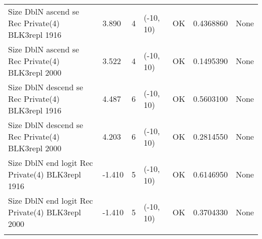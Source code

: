 \documentclass[11pt,
  english,
  letterpaper,
]{article}
\begin{document}
\begin{landscape}
\begin{longtable}[t]{>{\raggedright\arraybackslash}p{7cm}lllll>{\raggedright\arraybackslash}p{4cm}}
Size DblN ascend se Rec Private(4) BLK3repl 1916 & 3.890 & 4 & (-10, 10) & OK & 0.4368860 & None\\
Size DblN ascend se Rec Private(4) BLK3repl 2000 & 3.522 & 4 & (-10, 10) & OK & 0.1495390 & None\\
Size DblN descend se Rec Private(4) BLK3repl 1916 & 4.487 & 6 & (-10, 10) & OK & 0.5603100 & None\\
Size DblN descend se Rec Private(4) BLK3repl 2000 & 4.203 & 6 & (-10, 10) & OK & 0.2814550 & None\\
Size DblN end logit Rec Private(4) BLK3repl 1916 & -1.410 & 5 & (-10, 10) & OK & 0.6146950 & None\\
Size DblN end logit Rec Private(4) BLK3repl 2000 & -1.410 & 5 & (-10, 10) & OK & 0.3704330 & None\\*
\end{longtable}
\endgroup{}
\end{landscape}
\endgroup{}





\newpage

\begingroup\fontsize{10}{12}\selectfont
\end{document}
